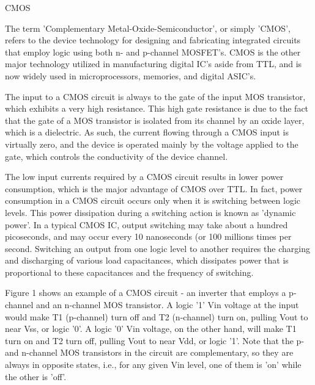 CMOS



The term 'Complementary Metal-Oxide-Semiconductor', or simply 'CMOS', refers to the device technology for designing and fabricating integrated circuits that employ logic using both n- and p-channel MOSFET's.  CMOS is the other major technology utilized in manufacturing digital IC's aside from TTL, and is now widely used in microprocessors, memories, and digital ASIC's.



The input to a CMOS circuit is always to the gate of the input MOS transistor, which exhibits a very high resistance.  This high gate resistance is due to the fact that the gate of a MOS transistor is isolated from its channel by an oxide layer, which is a dielectric.  As such,  the current flowing through a CMOS input is virtually zero, and the device is operated mainly by the voltage applied to the gate, which controls the conductivity of the device channel.





The low input currents required by a CMOS circuit results in lower power consumption, which is the major advantage of CMOS over TTL.  In fact, power consumption in a CMOS circuit occurs only when it is switching between logic levels.  This power dissipation during a switching action is known as 'dynamic power'.  In a typical CMOS IC, output switching may take about a hundred picoseconds, and may occur every 10 nanoseconds (or 100 millions times per second.  Switching an output from one logic level to another requires the charging and discharging of various load capacitances, which dissipates power that is proportional to these capacitances and the frequency of switching.



Figure 1 shows an example of a CMOS circuit - an inverter that employs a p-channel and an n-channel MOS transistor. A logic '1' Vin voltage at the input would make T1 (p-channel) turn off and T2 (n-channel) turn on, pulling Vout to near Vss, or logic '0'.  A logic '0' Vin voltage, on the other hand, will make T1 turn on and T2 turn off, pulling Vout to near Vdd, or logic '1'.  Note that the p- and n-channel MOS transistors in the circuit are complementary, so they are always in opposite states, i.e., for any given Vin level, one of them is 'on' while the other is 'off'.







